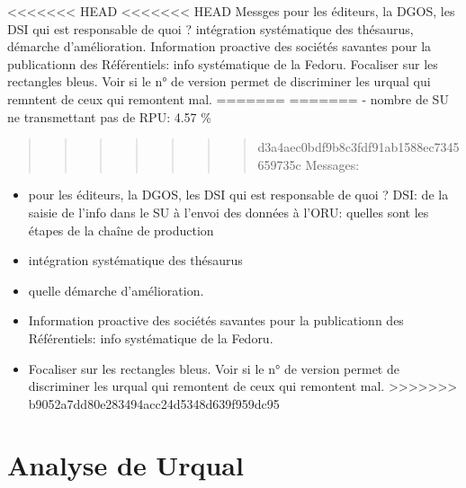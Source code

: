 \documentclass[]{article}
\providecommand{\tightlist}{%
  \setlength{\itemsep}{0pt}\setlength{\parskip}{0pt}}
\begin{document}
\textless{}\textless{}\textless{}\textless{}\textless{}\textless{}\textless{}
HEAD
\textless{}\textless{}\textless{}\textless{}\textless{}\textless{}\textless{}
HEAD Messges pour les éditeurs, la DGOS, les DSI qui est responsable de
quoi ? intégration systématique des thésaurus, démarche d'amélioration.
Information proactive des sociétés savantes pour la publicationn des
Référentiels: info systématique de la Fedoru. Focaliser sur les
rectangles bleus. Voir si le n° de version permet de discriminer les
urqual qui remntent de ceux qui remontent mal. ======= ======= - nombre
de SU ne transmettant pas de RPU: 4.57 \%

\begin{quote}
\begin{quote}
\begin{quote}
\begin{quote}
\begin{quote}
\begin{quote}
\begin{quote}
d3a4aec0bdf9b8c3fdf91ab1588ec7345659735c Messages:
\end{quote}
\end{quote}
\end{quote}
\end{quote}
\end{quote}
\end{quote}
\end{quote}

\begin{itemize}
\tightlist
\item
  pour les éditeurs, la DGOS, les DSI qui est responsable de quoi ? DSI:
  de la saisie de l'info dans le SU à l'envoi des données à l'ORU:
  quelles sont les étapes de la chaîne de production
\item
  intégration systématique des thésaurus
\item
  quelle démarche d'amélioration.
\item
  Information proactive des sociétés savantes pour la publicationn des
  Référentiels: info systématique de la Fedoru.
\item
  Focaliser sur les rectangles bleus. Voir si le n° de version permet de
  discriminer les urqual qui remontent de ceux qui remontent mal.
  \textgreater{}\textgreater{}\textgreater{}\textgreater{}\textgreater{}\textgreater{}\textgreater{}
  b9052a7dd80e283494acc24d5348d639f959dc95
\end{itemize}

\section{Analyse de Urqual}\label{analyse-de-urqual}
\end{document}
